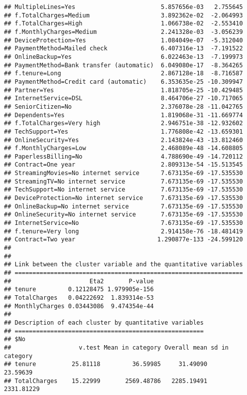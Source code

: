 \documentclass[
  a4paper]{article}
\begin{document}
\begin{verbatim}
## MultipleLines=Yes                        5.857656e-03   2.755645
## f.TotalCharges=Medium                    3.892362e-02  -2.064993
## f.TotalCharges=High                      1.066738e-02  -2.553410
## f.MonthlyCharges=Medium                  2.241328e-03  -3.056239
## DeviceProtection=Yes                     1.084049e-07  -5.312040
## PaymentMethod=Mailed check               6.407316e-13  -7.191522
## OnlineBackup=Yes                         6.022463e-13  -7.199973
## PaymentMethod=Bank transfer (automatic)  6.049080e-17  -8.364265
## f.tenure=Long                            2.867128e-18  -8.716587
## PaymentMethod=Credit card (automatic)    6.353635e-25 -10.309947
## Partner=Yes                              1.818705e-25 -10.429485
## InternetService=DSL                      8.464706e-27 -10.717065
## SeniorCitizen=No                         2.376078e-28 -11.042765
## Dependents=Yes                           1.819068e-31 -11.669774
## f.TotalCharges=Very high                 2.946751e-38 -12.932602
## TechSupport=Yes                          1.776808e-42 -13.659301
## OnlineSecurity=Yes                       2.143824e-43 -13.812460
## f.MonthlyCharges=Low                     2.468089e-48 -14.608805
## PaperlessBilling=No                      4.788690e-49 -14.720112
## Contract=One year                        2.809313e-54 -15.513545
## StreamingMovies=No internet service      7.673135e-69 -17.535530
## StreamingTV=No internet service          7.673135e-69 -17.535530
## TechSupport=No internet service          7.673135e-69 -17.535530
## DeviceProtection=No internet service     7.673135e-69 -17.535530
## OnlineBackup=No internet service         7.673135e-69 -17.535530
## OnlineSecurity=No internet service       7.673135e-69 -17.535530
## InternetService=No                       7.673135e-69 -17.535530
## f.tenure=Very long                       2.914158e-76 -18.481419
## Contract=Two year                       1.290877e-133 -24.599120
## 
## 
## Link between the cluster variable and the quantitative variables
## ================================================================
##                      Eta2       P-value
## tenure         0.12128475 1.979905e-156
## TotalCharges   0.04222692  1.839314e-53
## MonthlyCharges 0.03443086  9.474354e-44
## 
## Description of each cluster by quantitative variables
## =====================================================
## $No
##                   v.test Mean in category Overall mean sd in category
## tenure          25.81118         36.59985     31.49090       23.59639
## TotalCharges    15.22999       2569.48786   2285.19491     2331.81229

\end{verbatim}
\end{document}
